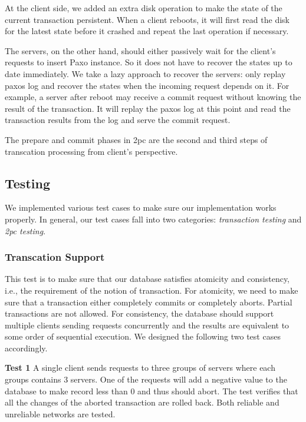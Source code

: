 \documentclass{vldb}
\begin{document}
At the client side, we added an extra disk operation to make the state of the current
transaction persistent. When a client reboots, it will first read the disk for the
latest state before it crashed and repeat the last operation if necessary. 

The servers, on the other hand, should either passively wait for the client’s
requests to insert Paxo instance. So it does not have to recover the states up to
date immediately. We take a lazy approach to recover the servers: only replay paxos
log and recover the states when the incoming request depends on it. For example, a
server after reboot may receive a commit request without knowing the result of the
transaction. It will replay the paxos log at this point and read the transaction
results from the log and serve the commit request.

The prepare and commit phases in 2pc are the second and third steps of transcation
processing from client's perspective.



\subsection{Testing}

We implemented various test cases to make sure our implementation 
works properly. In general, our test cases fall into two categories: 
\textit{transaction testing} and \textit{2pc testing}. 

\subsubsection{Transcation Support}

This test is to make sure that our database satisfies atomicity and 
consistency, i.e., the requirement of the notion of transaction. For 
atomicity, we need to make sure that a transaction either completely 
commits or completely aborts. Partial transactions are not allowed.  
For consistency, the database should support multiple clients sending 
requests concurrently and the results are equivalent to some order of 
sequential execution. We designed the following two test cases 
accordingly.

\textbf{Test 1} A single client sends requests to three groups of 
servers where each groups contains 3 servers. One of the requests
will add a negative value to the database to make record less than 0 
and thus should abort. The test verifies that all the changes of the 
aborted transaction are rolled back. Both reliable and unreliable 
networks are tested.
\end{document}
